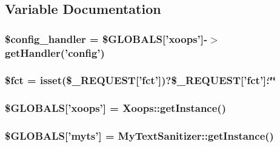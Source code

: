 \subsection{Variable Documentation}
\hypertarget{admin_2index_8php_a3906023967379550e215cdec8f56ae20}{
\subsubsection[{\$config\-\_\-handler}]{\setlength{\rightskip}{0pt plus 5cm}\$config\-\_\-handler = \$G\-L\-O\-B\-A\-L\-S\mbox{[}'xoops'\mbox{]}-\/$>$get\-Handler('config')}}\label{admin_2index_8php_a3906023967379550e215cdec8f56ae20}
\hypertarget{admin_2index_8php_acc8d70c12faff4b8d057986eece72b6c}{
\subsubsection[{\$fct}]{\setlength{\rightskip}{0pt plus 5cm}\$fct = isset(\$\-\_\-\-R\-E\-Q\-U\-E\-S\-T\mbox{[}'fct'\mbox{]})?\$\-\_\-\-R\-E\-Q\-U\-E\-S\-T\mbox{[}'fct'\mbox{]}\-:\char`\"{}\char`\"{}}}\label{admin_2index_8php_acc8d70c12faff4b8d057986eece72b6c}
\hypertarget{admin_2index_8php_ad10934112c0d18cf6b358d47afa6fcf1}{
\subsubsection[{\$\-G\-L\-O\-B\-A\-L\-S}]{\setlength{\rightskip}{0pt plus 5cm}\$G\-L\-O\-B\-A\-L\-S\mbox{[}'xoops'\mbox{]} = Xoops\-::get\-Instance()}}\label{admin_2index_8php_ad10934112c0d18cf6b358d47afa6fcf1}
\hypertarget{admin_2index_8php_aea741b6e2c7fbb6439b8cdb3091591a4}{
\subsubsection[{\$\-G\-L\-O\-B\-A\-L\-S}]{\setlength{\rightskip}{0pt plus 5cm}\$G\-L\-O\-B\-A\-L\-S\mbox{[}'myts'\mbox{]} = My\-Text\-Sanitizer\-::get\-Instance()}}\label{admin_2index_8php_aea741b6e2c7fbb6439b8cdb3091591a4}
